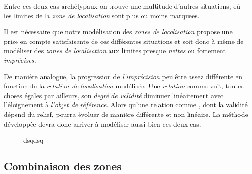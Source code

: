 Entre ces deux cas archétypaux on trouve une multitude d'autres
situations, où les limites de la \emph{zone de localisation} sont plus
ou moins marquées.

Il est nécessaire que notre modélisation des \emph{zones de
  localisation} propose une prise en compte satisfaisante de ces
différentes situations et soit donc à même de modéliser des
\emph{zones de localisation} aux limites presque \emph{nettes} ou
fortement \emph{imprécises.}


De manière analogue, la progression de \emph{l'imprécision} peu être
assez différente en fonction de la \emph{relation de localisation}
modélisée. Une \emph{relation} comme  voit, toutes
choses égales par ailleurs, son \textsl{degré de validité} diminuer
linéairement avec l'éloignement à \emph{l'objet de référence.} Alors
qu'une relation comme , dont
la validité dépend du relief, pourra évoluer de manière différente et
non linéaire.
%
La méthode développée devra donc arriver à modéliser aussi bien ces
deux cas.


\begin{figure}
  \centering
  
  \caption{dsqdsq}
  \label{fig:temp}
\end{figure}


\subsection{Combinaison des zones}



